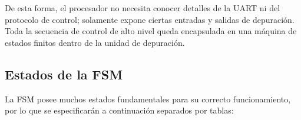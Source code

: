 De esta forma, el procesador no necesita conocer detalles de la UART ni del protocolo de control; solamente expone ciertas entradas y salidas de depuración. Toda la secuencia de control de alto nivel queda encapsulada en una máquina de estados finitos dentro de la unidad de depuración.

\subsection{Estados de la FSM}




La FSM posee muchos estados fundamentales para su correcto funcionamiento, por lo que se especificarán a continuación separados por tablas:

